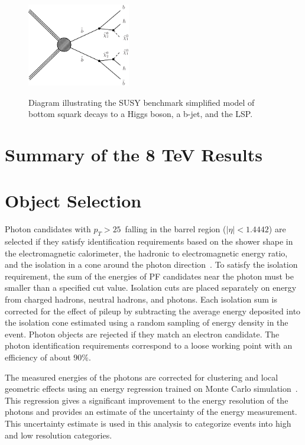 \begin{figure}[ht!]
\centering
\includegraphics[width=0.4\textwidth,angle=0.]{figs/T2bH.pdf}\\
\caption{Diagram illustrating the SUSY benchmark simplified model of bottom squark decays to a Higgs boson, a b-jet, and the LSP.
       \label{fig:T2bH}}
\end{figure}

\section{Summary of the 8 TeV Results}

\section{Object Selection}\label{sec:ObjectSelection}


Photon candidates with $p_{T}>25$~\GeV falling in the barrel region ($|\eta|<1.4442$) are selected if 
they satisfy identification requirements based on the shower shape in the electromagnetic calorimeter, the hadronic to
electromagnetic energy ratio, and the isolation in a cone around the photon direction~\cite{Khachatryan:2014ira}. 
To satisfy the isolation requirement, the sum of the energies of PF candidates near the photon must be 
smaller than a specified cut value.  Isolation cuts are placed separately on energy from charged hadrons, 
neutral hadrons, and photons.  Each isolation sum is corrected for the effect of pileup by subtracting the
average energy deposited into the isolation cone estimated using a random
sampling of energy density in the event. Photon objects are rejected if 
they match an electron candidate. The photon identification requirements correspond to a loose working 
point with an efficiency of about $90\%$.


The measured energies of the photons are corrected for clustering and local
geometric effects using an energy regression trained on
 Monte Carlo simulation~\cite{Khachatryan:2015iwa}. This regression gives a significant
improvement to the energy resolution of the photons and provides an estimate of the uncertainty of the energy measurement. 
This uncertainty estimate is used in this analysis to categorize events into high and low resolution categories. 


